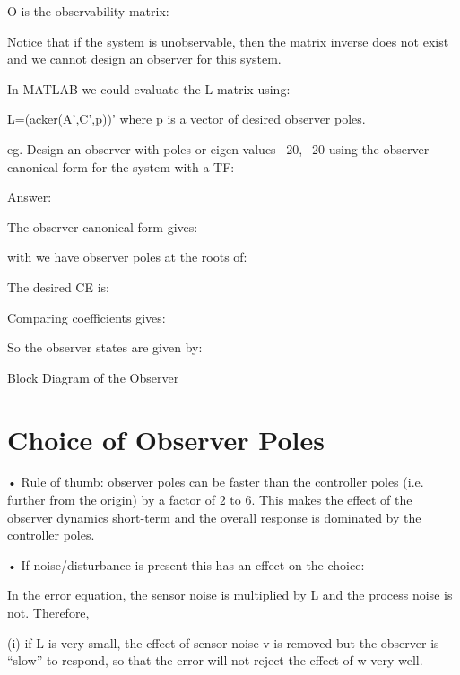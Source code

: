  

O is the observability matrix:
 

 

Notice that if the system is unobservable, then the matrix inverse does not exist and we cannot design an observer for this system.

In MATLAB we could evaluate the L matrix using:

L=(acker(A',C',p))'  where  p  is a vector of desired observer poles.
 
eg.  Design an observer with poles or eigen values
–20,−20 using the observer canonical form for the system with a TF:
 
Answer:

The observer canonical form gives:

 

with     we have observer poles at the roots of:

 

The desired CE is:

 

 
Comparing coefficients gives:

 

So the observer states are given by:

 

Block Diagram of the Observer














 
\section*{Choice of Observer Poles} %
\label{sec:choice_of_observer_poles}


•	Rule of thumb:   observer poles can be faster than the controller poles (i.e. further from the origin) by a factor of 2 to 6. This makes the effect of the observer dynamics short-term and the overall response is dominated by the controller poles.

•	If noise/disturbance is present this has an effect on the choice:
 

In the error equation, the sensor noise is multiplied by L and the process noise is not. Therefore,

 
(i)  if  L  is very small, the effect of sensor noise  v  is removed but the observer is “slow” to respond, so that the error will not reject the effect of  w  very well.

